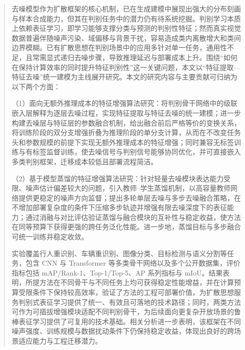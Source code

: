\setlength{\baselineskip}{20pt}
\begin{abstract}
去噪模型作为扩散框架的核心机制，已在生成建模中展现出强大的分布刻画与样本合成能力，但其在判别任务中的潜力仍有待系统挖掘。判别学习本质上依赖表征学习，即学习能够支撑分类与预测的判别性特征；然而真实视觉数据普遍伴随噪声污染、域偏移与背景干扰，容易造成类内离散增大和类间边界模糊。已有扩散思想在判别场景中的应用多针对单一任务，通用性不足，且常需显式递归去噪步骤，导致推理延迟与部署成本上升。围绕“如何在保持计算效率的同时提升特征判别性”这一关键问题，本文以“特征提取—特征去噪”统一建模为主线展开研究。本文的研究内容与主要贡献可归纳为以下两个方面：
\par
（1）面向无额外推理成本的特征增强算法研究：将判别骨干网络中的级联嵌入层解释为逐层去噪过程，实现特征提取与特征去噪的统一建模；进一步构建去噪层与特征层的参数融合机制，给出融合前后严格等价的变换关系，将训练阶段的双分支增强折叠为推理阶段的单分支计算，从而在不改变任务头和参数规模的前提下实现无额外推理成本的特征增强；同时兼容无标签训练与有标签监督训练，使去噪信号与判别信号能够协同优化，并可直接嵌入多类判别框架，迁移成本较低且部署流程简洁。
\par
（2）基于模型蒸馏的特征增强算法研究：针对轻量去噪模块表达能力受限、噪声估计偏差较大的问题，引入教师--学生蒸馏机制，以高容量教师网络提供更稳定的噪声方向监督；提出多轮单层去噪与多步去噪融合策略，在不增加部署复杂度的条件下压缩多步轨迹并增强有限去噪深度下的表征能力；通过消融与对比评估验证蒸馏与融合模块的互补性与稳定收益，使方法在同等预算下获得更强的跨任务泛化性能。进一步地，蒸馏目标与多步融合可统一训练并稳定收敛。
\par
实验覆盖行人重识别、车辆重识别、图像分类、目标检测与语义分割等任务，包含 CNN 与 Transformer 等多类骨干网络以及多个公开数据集，评价指标包括 mAP/Rank-1、Top-1/Top-5、AP 系列指标与 mIoU。结果表明，所提方法在不同骨干与不同任务上均可获得稳定性能增益，并在计算预算受限条件下保持较高效率，验证了方法的工程可部署价值，为扩散思想服务判别式表征学习提供了统一、有效且可落地的技术路径；同时，两类方法可作为可插拔增强模块适配不同判别骨干，为后续面向更复杂开放场景的鲁棒表征学习提供了可复用的技术基础。相关分析进一步表明，该框架在不同噪声强度、训练规模与数据扰动条件下仍保持稳定收益，体现出良好的跨场景适应能力与工程迁移潜力。
\par\noindent{}
\end{abstract}
